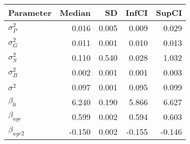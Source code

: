 \begin{table}[ht]
\centering
\begin{tabular}{lrrrr}
  \hline
Parameter & Median & SD & InfCI & SupCI \\ 
  \hline
$\sigma^{2}_{P}$ & 0.016 & 0.005 & 0.009 & 0.029 \\ 
  $\sigma^{2}_{G}$ & 0.011 & 0.001 & 0.010 & 0.013 \\ 
  $\sigma^{2}_{S}$ & 0.110 & 0.540 & 0.028 & 1.032 \\ 
  $\sigma^{2}_{B}$ & 0.002 & 0.001 & 0.001 & 0.003 \\ 
  $\sigma^{2}$ & 0.097 & 0.001 & 0.095 & 0.099 \\ 
  $\beta_{0}$ & 6.240 & 0.190 & 5.866 & 6.627 \\ 
  $\beta_{age}$ & 0.599 & 0.002 & 0.594 & 0.603 \\ 
  $\beta_{age2}$ & -0.150 & 0.002 & -0.155 & -0.146 \\ 
   \hline
\end{tabular}
\end{table}
